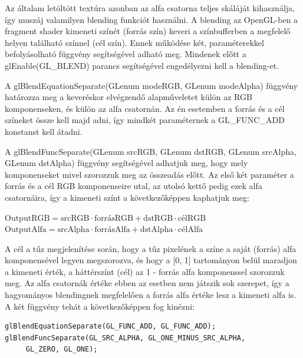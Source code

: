 Az általam letöltött textúra azonban az alfa csatorna teljes skáláját kihasználja, így muszáj valamilyen blending funkciót használni. A blending az OpenGL-ben a fragment shader kimeneti színét (forrás szín) keveri a színbufferben a megfelelő helyen található színnel (cél szín). Ennek működése két, paraméterekkel befolyásolható függvény segítségével adható meg. Mindenek előtt a glEnable(GL\_BLEND) parancs segítségével engedélyezni kell a blending-et.

A glBlendEquationSeparate(GLenum modeRGB, GLenum modeAlpha) függvény határozza meg a keveréskor elvégzendő alapműveletet külön az RGB komponenseken, és külön az alfa csatornán. Az én esetemben a forrás és a cél színeket össze kell majd adni, így mindkét paraméternek a GL\_FUNC\_ADD konstanst kell átadni.

A glBlendFuncSeparate(GLenum srcRGB, GLenum dstRGB, GLenum srcAlpha, GLenum dstAlpha) függvény segítségével adhatjuk meg, hogy mely komponenseket mivel szorozzuk meg az összeadás előtt. Az első két paraméter a forrás és a cél RGB komponenseire utal, az utolsó kettő pedig ezek alfa csatornáira, így a kimeneti színt a következőképpen kaphatjuk meg: 
\begin{center}
$\text{OutputRGB} = \text{srcRGB} \cdot \text{forrásRGB} + \text{dstRGB} \cdot \text{célRGB}$
$\text{OutputAlfa} = \text{srcAlpha} \cdot \text{forrásAlfa} + \text{dstAlpha} \cdot \text{célAlfa}$
\end{center}
A cél a tűz megjelenítése során, hogy a tűz pixelének a színe a saját (forrás) alfa komponensével legyen megszorozva, és hogy a [0, 1] tartományon belül maradjon a kimeneti érték, a háttérszínt (cél) az 1 - forrás alfa komponenssel szorozzuk meg. Az alfa csatornák értéke ebben az esetben nem játszik sok szerepet, így a hagyományos blendingnek megfelelően a forrás alfa értéke lesz a kimeneti alfa is. A két függvény tehát a következőképpen fog kinézni:
\begin{lstlisting}
glBlendEquationSeparate(GL_FUNC_ADD, GL_FUNC_ADD);
glBlendFuncSeparate(GL_SRC_ALPHA, GL_ONE_MINUS_SRC_ALPHA,
	 GL_ZERO, GL_ONE);
\end{lstlisting}

